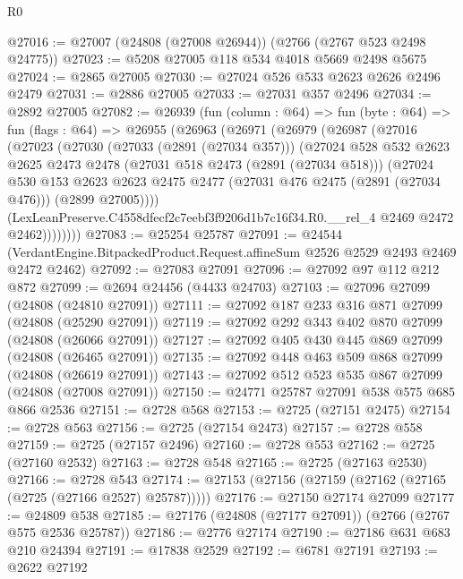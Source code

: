 \begin{lexlean}{R0}
\begin{coremodule}
@27016 := @27007 (@24808 (@27008 @26944)) (@2766 (@2767 @523 @2498 @24775))
@27023 := @5208 @27005 @118 @534 @4018 @5669 @2498 @5675
@27024 := @2865 @27005
@27030 := @27024 @526 @533 @2623 @2626 @2496 @2479
@27031 := @2886 @27005
@27033 := @27031 @357 @2496
@27034 := @2892 @27005
@27082 := @26939
    (fun (column : @64) =>
    fun (byte : @64) =>
    fun (flags : @64) =>
    @26955
      (@26963
        (@26971
          (@26979
            (@26987
              (@27016
                (@27023
                  (@27030
                    (@27033 (@2891 (@27034 @357)))
                    (@27024
                      @528
                      @532
                      @2623
                      @2625
                      @2473
                      @2478
                      (@27031 @518 @2473 (@2891 (@27034 @518)))
                      (@27024
                        @530
                        @153
                        @2623
                        @2623
                        @2475
                        @2477
                        (@27031 @476 @2475 (@2891 (@27034 @476)))
                        (@2899 @27005))))
                  (LexLeanPreserve.C4558dfecf2c7eebf3f9206d1b7c16f34.R0.__rel_4
                    @2469
                    @2472
                    @2462))))))))
@27083 := @25254 @25787
@27091 := @24544
    (VerdantEngine.BitpackedProduct.Request.affineSum @2526 @2529 @2493 @2469 @2472 @2462)
@27092 := @27083 @27091
@27096 := @27092 @97 @112 @212 @872
@27099 := @2694 @24456 (@4433 @24703)
@27103 := @27096 @27099 (@24808 (@24810 @27091))
@27111 := @27092 @187 @233 @316 @871 @27099 (@24808 (@25290 @27091))
@27119 := @27092 @292 @343 @402 @870 @27099 (@24808 (@26066 @27091))
@27127 := @27092 @405 @430 @445 @869 @27099 (@24808 (@26465 @27091))
@27135 := @27092 @448 @463 @509 @868 @27099 (@24808 (@26619 @27091))
@27143 := @27092 @512 @523 @535 @867 @27099 (@24808 (@27008 @27091))
@27150 := @24771 @25787 @27091 @538 @575 @685 @866 @2536
@27151 := @2728 @568
@27153 := @2725 (@27151 @2475)
@27154 := @2728 @563
@27156 := @2725 (@27154 @2473)
@27157 := @2728 @558
@27159 := @2725 (@27157 @2496)
@27160 := @2728 @553
@27162 := @2725 (@27160 @2532)
@27163 := @2728 @548
@27165 := @2725 (@27163 @2530)
@27166 := @2728 @543
@27174 := @27153 (@27156 (@27159 (@27162 (@27165 (@2725 (@27166 @2527) @25787)))))
@27176 := @27150 @27174 @27099
@27177 := @24809 @538
@27185 := @27176 (@24808 (@27177 @27091)) (@2766 (@2767 @575 @2536 @25787))
@27186 := @2776 @27174
@27190 := @27186 @631 @683 @210 @24394
@27191 := @17838 @2529
@27192 := @6781 @27191
@27193 := @2622 @27192

\end{coremodule}
\end{lexlean}
